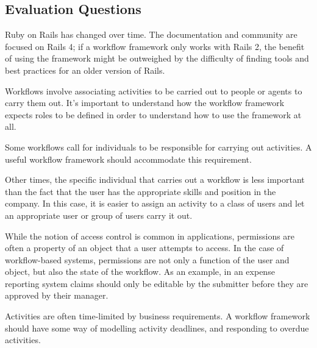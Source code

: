 \subsection {Evaluation Questions}
\label {sec:evaluation-questions}



Ruby on Rails has changed over time. The documentation and community are focused on Rails 4; if a workflow framework only works with Rails 2, the benefit of using the framework might be outweighed by the difficulty of finding tools and best practices for an older version of Rails.


Workflows involve associating activities to be carried out to people or agents to carry them out. It’s important to understand how the workflow framework expects roles to be defined in order to understand how to use the framework at all.


Some workflows call for individuals to be responsible for carrying out activities. A useful workflow framework should accommodate this requirement.


Other times, the specific individual that carries out a workflow is less important than the fact that the user has the appropriate skills and position in the company. In this case, it is easier to assign an activity to a class of users and let an appropriate user or group of users carry it out.

 
While the notion of access control is common in applications, permissions are often a property of an object that a user attempts to access. In the case of workflow-based systems, permissions are not only a function of the user and object, but also the state of the workflow. As an example, in an expense reporting system claims should only be editable by the submitter before they are approved by their manager.


Activities are often time-limited by business requirements. A workflow framework should have some way of modelling activity deadlines, and responding to overdue activities.

